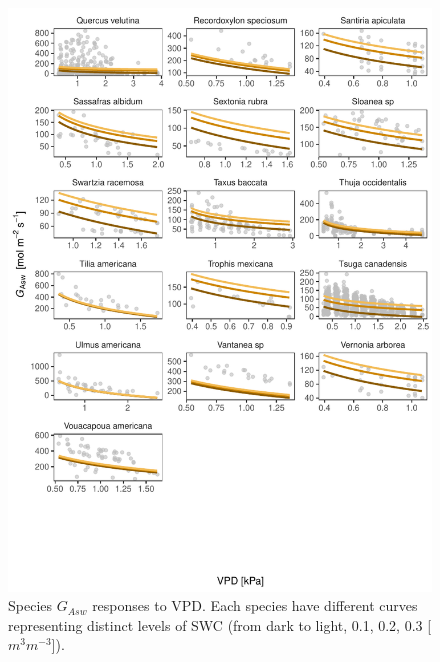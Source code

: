 \documentclass[11pt,twoside]{reedthesis}
\begin{document}
\begin{figure}[H]

{\centering \includegraphics[width=1\linewidth]{figure/appendixD/ggg7} 

}

\caption{Species $G_{Asw}$ responses to VPD. Each species have different curves representing distinct levels of SWC (from dark to light, 0.1, 0.2, 0.3 [$m^3 m^{-3}$]).}\label{fig:unnamed-chunk-25}
\end{figure}
\end{document}
